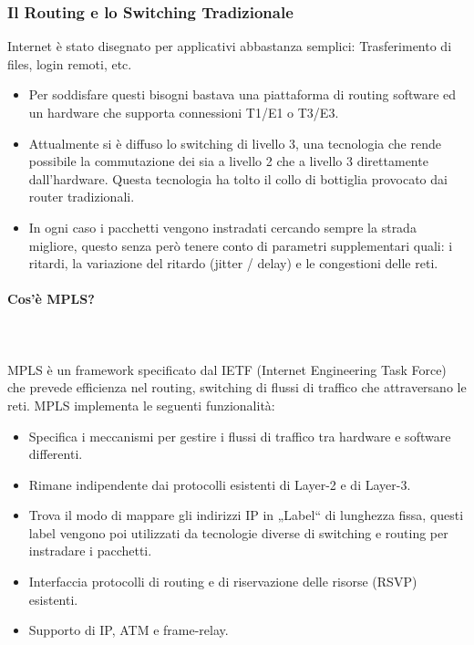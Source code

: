 \documentclass{article}
\begin{document}
\subsubsection{Il Routing e lo Switching Tradizionale}
Internet è stato disegnato per applicativi abbastanza semplici: Trasferimento di files, login remoti, etc.
\begin{itemize}
    \item Per soddisfare questi bisogni bastava una piattaforma di routing software ed un hardware 
    che supporta connessioni T1/E1 o T3/E3.
    \item Attualmente si è diffuso lo switching di livello 3, una tecnologia che rende possibile 
    la commutazione dei sia a livello 2 che a livello 3 direttamente dall’hardware. Questa tecnologia 
    ha tolto il collo di bottiglia provocato dai router tradizionali.
    \item In ogni caso i pacchetti vengono instradati cercando sempre la strada migliore, questo senza 
    però tenere conto di parametri supplementari quali: i ritardi, la variazione del ritardo 
    (jitter / delay) e le congestioni delle reti.
\end{itemize}
\paragraph{Cos’è MPLS?}
\noindent
\\\\
MPLS è un framework specificato dal IETF (Internet Engineering Task Force) che prevede efficienza 
nel routing, switching di flussi di traffico che attraversano le reti. MPLS implementa le seguenti funzionalità:
\begin{itemize}
    \item Specifica i meccanismi per gestire i flussi di traffico tra hardware e software differenti.
    \item Rimane indipendente dai protocolli esistenti di Layer-2 e di Layer-3.
    \item Trova il modo di mappare gli indirizzi IP in „Label“ di lunghezza fissa, questi label vengono poi utilizzati 
    da tecnologie diverse di switching e routing per instradare i pacchetti.
    \item Interfaccia protocolli di routing e di riservazione delle risorse (RSVP) esistenti.
    \item Supporto di IP, ATM e frame-relay.
\end{itemize}
\end{document}
